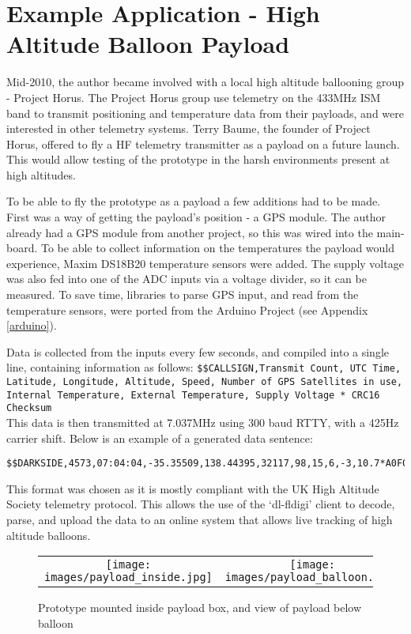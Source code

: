 \documentclass[a4paper,12pt]{article}
\begin{document}
\section{Example Application - High Altitude Balloon Payload}
\label{example_app}
Mid-2010, the author became involved with a local high altitude ballooning group - Project Horus. The Project Horus group use telemetry on the 433MHz ISM band to transmit positioning and temperature data from their payloads, and were interested in other telemetry systems. Terry Baume, the founder of Project Horus, offered to fly a HF telemetry transmitter as a payload on a future launch. This would allow testing of the prototype in the harsh environments present at high altitudes. 

To be able to fly the prototype as a payload a few additions had to be made. First was a way of getting the payload's position - a GPS module. The author already had a GPS module from another project, so this was wired into the main-board. To be able to collect information on the temperatures the payload would experience, Maxim DS18B20 temperature sensors were added. The supply voltage was also fed into one of the ADC inputs via a voltage divider, so it can be measured. To save time, libraries to parse GPS input, and read from the temperature sensors, were ported from the Arduino Project (see Appendix \ref{arduino}).

Data is collected from the inputs every few seconds, and compiled into a single line, containing information as follows:
\texttt{\$\$CALLSIGN,Transmit Count, UTC Time, Latitude, Longitude, Altitude, Speed, Number of GPS Satellites in use, Internal Temperature, External Temperature, Supply Voltage * CRC16 Checksum}\\
This data is then transmitted at 7.037MHz using 300 baud RTTY, with a 425Hz carrier shift.
Below is an example of a generated data sentence:
\begin{verbatim}
$$DARKSIDE,4573,07:04:04,-35.35509,138.44395,32117,98,15,6,-3,10.7*A0F0
\end{verbatim}

This format was chosen as it is mostly compliant with the UK High Altitude Society telemetry protocol\citep{ref:ukhas}. This allows the use of the `dl-fldigi' client to decode, parse, and upload the data to an online system that allows live tracking of high altitude balloons.

\begin{figure}[h]
  \begin{center}
  \begin{tabular}{cc}
    \texttt{[image: images/payload\_inside.jpg]} &
    \texttt{[image: images/payload\_balloon.jpg]}\\
  \end{tabular}
  \end{center}
  \caption{Prototype mounted inside payload box, and view of payload below balloon}
  \label{fig:payload_inside}
\end{figure}
\end{document}
